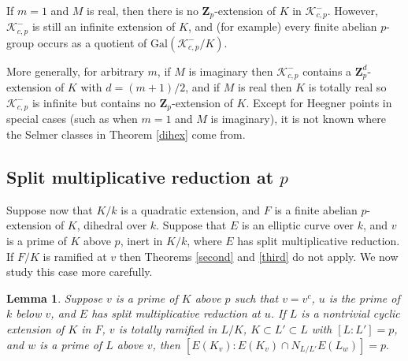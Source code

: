 \documentclass[reqno]{amsart}
\newtheorem{lem}[thm]{Lemma}
\theoremstyle{definition}
\def\Z{\mathbf{Z}}
\def\Zp{\Z_p}
\def\K{\mathcal{K}}
\def\Gal{\mathrm{Gal}}
\def\k{k}
\def\Kantip{\K^-_{c,p}}
\begin{document}
If $m = 1$ and $M$ is real, then there is no $\Zp$-extension of $K$ 
in $\Kantip$.  However, $\Kantip$ is still an infinite extension of $K$, 
and (for example) 
every finite abelian $p$-group occurs as a quotient of $\Gal(\Kantip/K)$.  

More generally, for arbitrary $m$, if $M$ is imaginary then $\Kantip$ contains 
a $\Zp^d$-exten\-sion of $K$ with $d = (m+1)/2$, and if $M$ is real then 
$K$ is totally real so $\Kantip$ is 
infinite but contains no $\Zp$-extension of $K$.  Except for Heegner points 
in special cases (such as when $m = 1$ and $M$ is imaginary), it is not known where 
the Selmer classes in Theorem \ref{dihex} come from.

\subsection{Split multiplicative reduction at $p$}
Suppose now that $K/\k$ is a quadratic extension, and $F$ is a finite abelian 
$p$-extension of $K$, dihedral over $\k$.  Suppose that $E$ is an elliptic 
curve over $\k$, and $v$ is a prime of $K$ above $p$, inert in $K/\k$, where $E$ has 
split multiplicative reduction.  If $F/K$ is ramified at $v$ then 
Theorems \ref{second} and \ref{third} do not apply.  We now study this case more 
carefully.

\begin{lem}
\label{badlem}
Suppose $v$ is a prime of $K$ above $p$ such that $v = v^c$, $u$ is the 
prime of $\k$ below $v$, and  
$E$ has split multiplicative reduction at $u$.  If $L$ is a nontrivial cyclic 
extension of $K$ in  $F$, $v$ is totally ramified in $L/K$, 
$K \subset L' \subset L$ with $[L:L'] = p$, 
and $w$ is a prime of $L$ above $v$, then 
$
[E(K_v) : E(K_v) \cap N_{L/L'}E(L_w)] = p.
$
\end{lem} 
\end{document}
